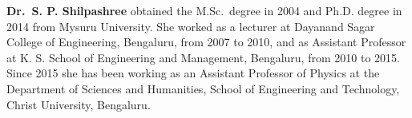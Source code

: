 \noindent
\textbf{Dr.\ S. P. Shilpashree} obtained the M.Sc.\ degree in 2004 and Ph.D. degree in 2014 from Mysuru University. She worked as a lecturer at Dayanand Sagar College of Engineering, Bengaluru, from 2007 to 2010, and as Assistant Professor at K. S. School of Engineering and Management, Bengaluru, from 2010 to 2015. Since 2015 she has been working as an Assistant Professor of Physics at the Department of Sciences and Humanities, School of Engineering and Technology, Christ University, Bengaluru.
